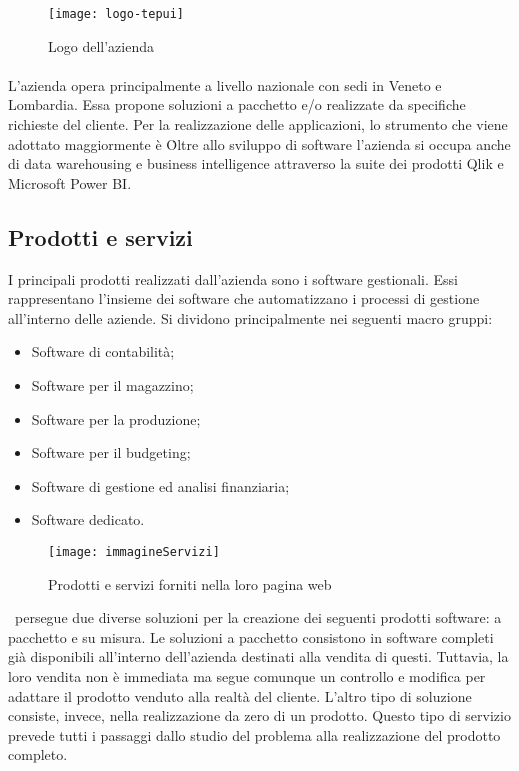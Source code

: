 \begin{figure}[!h] 
	\centering 
	\texttt{[image: logo-tepui]} 
	\caption{Logo dell'azienda}
\end{figure}

\paragraph*{}L'azienda opera principalmente a livello nazionale con sedi in Veneto e Lombardia. Essa propone soluzioni a pacchetto e/o realizzate da specifiche richieste del cliente. Per la realizzazione delle applicazioni, lo strumento che viene adottato maggiormente è \inde\.
Oltre allo sviluppo di software l'azienda si occupa anche di data warehousing e business intelligence attraverso la suite dei prodotti Qlik e Microsoft Power BI.


\subsection{Prodotti e servizi}
\label{cap1:Prodotti e servizi}
I principali prodotti realizzati dall'azienda sono i software gestionali. Essi rappresentano l'insieme dei software che automatizzano i processi di gestione all'interno delle aziende. Si dividono principalmente nei seguenti macro gruppi:
\begin{itemize}
	\item Software di contabilità;
	\item Software per il magazzino;
	\item Software per la produzione;
	\item Software per il budgeting;
	\item Software di gestione ed analisi finanziaria;
	\item Software dedicato.
\end{itemize}

\begin{figure}[!h] 
	\centering 
	\texttt{[image: immagineServizi]} 
	\caption{Prodotti e servizi forniti nella loro pagina web}
\end{figure}

\azienda\ persegue due diverse soluzioni per la creazione dei seguenti prodotti software: a pacchetto e su misura. Le soluzioni a pacchetto consistono in software completi già disponibili all'interno dell'azienda destinati alla vendita di questi. Tuttavia, la loro vendita non è immediata ma segue comunque un controllo e modifica per adattare il prodotto venduto alla realtà del cliente. L'altro tipo di soluzione consiste, invece, nella realizzazione da zero di un prodotto. Questo tipo di servizio prevede tutti i passaggi dallo studio del problema alla realizzazione del prodotto completo.

